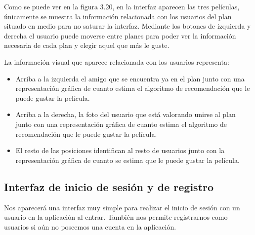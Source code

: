 \begin{flushleft}
Como se puede ver en la figura 3.20, en la interfaz aparecen las tres películas, únicamente se muestra la 
información relacionada con los usuarios del plan situado en medio para no saturar la interfaz. Mediante los 
botones de izquierda y derecha el usuario puede moverse entre planes para poder ver la información necesaria 
de cada plan y elegir aquel que más le guste.
\end{flushleft}
\begin{flushleft}
La información visual que aparece relacionada con los usuarios representa:
\begin{itemize}
    \item Arriba a la izquierda el amigo que se encuentra ya en el plan junto con una representación gráfica 
    de cuanto estima el algoritmo de recomendación que le puede gustar la película.
    \item Arriba a la derecha, la foto del usuario que está valorando unirse al plan junto con una representación 
    gráfica de cuanto estima el algoritmo de recomendación que le puede gustar la película.
    \item El resto de las posiciones identifican al resto de usuarios junto con la representación gráfica de 
    cuanto se estima que le puede gustar la película.
    
\end{itemize}
\end{flushleft}

\subsection{Interfaz de inicio de sesión y de registro}
\label{makereference3.4.6}

Nos aparecerá una interfaz muy simple para realizar el inicio de sesión con un usuario en la aplicación al entrar. También nos permite registrarnos como usuarios si
aún no poseemos una cuenta en la aplicación.

